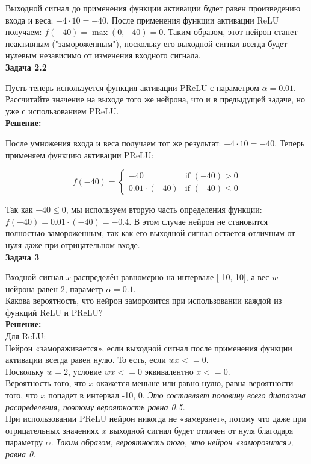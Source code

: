 Выходной сигнал до применения функции активации будет равен произведению входа и веса: $-4 \cdot 10 = -40$. После применения функции активации ReLU получаем: $f(-40) = \max(0, -40) = 0$. Таким образом, этот нейрон станет неактивным ("замороженным"), поскольку его выходной сигнал всегда будет нулевым независимо от изменения входного сигнала.\\
\textbf{Задача 2.2}

Пусть теперь используется функция активации PReLU с параметром $\alpha = 0.01$. Рассчитайте значение на выходе того же нейрона, что и в предыдущей задаче, но уже с использованием PReLU.\\
\textbf{Решение:}

После умножения входа и веса получаем тот же результат: $-4 \cdot 10 = -40$. Теперь применяем функцию активации PReLU:

$$ f(-40) = \begin{cases}
-40 & \text{if } (-40) > 0 \\
0.01 \cdot (-40) & \text{if } (-40) \leq 0
\end{cases} $$

Так как $-40 \leq 0$, мы используем вторую часть определения функции: $f(-40) = 0.01 \cdot (-40) = -0.4$. В этом случае нейрон не становится полностью замороженным, так как его выходной сигнал остается отличным от нуля даже при отрицательном входе.\\
\textbf{Задача 3}

Входной сигнал $x$ распределён равномерно на интервале [-10, 10], а вес $w$ нейрона равен 2, параметр $\alpha = 0.1$.\\
Какова вероятность, что нейрон заморозится при использовании каждой из функций ReLU и PReLU?\\
\textbf{Решение:}\\
Для ReLU:\\
Нейрон «замораживается», если выходной сигнал после применения функции активации всегда равен нулю. То есть, если $wx <= 0$.\\
Поскольку $w = 2$, условие $wx <= 0$ эквивалентно $x <= 0$.\\
Вероятность того, что $x$ окажется меньше или равно нулю, равна вероятности того, что $x$ попадет в интервал -10, 0. \textit{Это составляет половину всего диапазона распределения, поэтому вероятность равна 0.5.}\\
При использовании PReLU нейрон никогда не «замерзнет», потому что даже при отрицательных значениях $x$ выходной сигнал будет отличен от нуля благодаря параметру $\alpha$.
\textit{Таким образом, вероятность того, что нейрон «заморозится», равна 0.}

